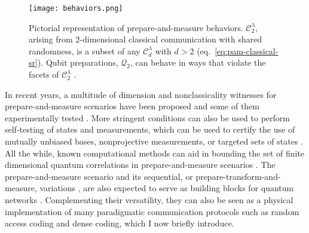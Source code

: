 			\begin{figure}
				\begin{minipage}[c]{0.43\textwidth}
					\centering
	                \texttt{[image: behaviors.png]}
			 	\end{minipage}
				\begin{minipage}[c]{0.55\textwidth}
					\caption{Pictorial representation of prepare-and-measure behaviors. $\mathcal{C}_2^\lambda$, arising from $2$-dimensional classical communication with shared randomness, is a subset of any $\mathcal{C}_d^\lambda$ with $d > 2$ (eq.~\ref{eq:pam-classical-sr}). Qubit preparations, $\mathcal{Q}_2$, can behave in ways that violate the facets of $\mathcal{C}_2^\lambda$ \cite{gallego_pam_2010}.}	
            		\label{fig:pam-behaviors}
			    \end{minipage}
			\end{figure}
			            
            \ornamentbreak
            
            In recent years, a multitude of dimension and nonclassicality witnesses for prepare-and-measure scenarios have been proposed \cite{gallego_pam_2010,brunner_dimension_2013,sikora_dimension_2016,dallarno_robustness_2012,de_vicente_bound_2019,bowles_certifying_2014,wehner_lower_2008} and some of them experimentally tested \cite{hendrych_experimental_2012,ahrens_experimental_2012,dambrosio_highdimensional_2014}. More stringent conditions can also be used to perform self-testing of states and measurements, which can be used to certify the use of mutually unbiased bases, nonprojective measurements, or targeted sets of states \cite{tavakoli_selftesting_2018,farkas_selftesting_2019,wei_selftesting_2019,mironowicz_fouroutcome_2019,tavakoli_selftesting_2020,miklin_universal_2021,moreno_pamdense_2021}. All the while, known computational methods can aid in bounding the set of finite dimensional quantum correlations in prepare-and-measure scenarios \cite{navascues_bounding_2015,navascues_characterizing_2015}. The prepare-and-measure scenario and its sequential, or prepare-transform-and-measure, variations \cite{mohan_sequential_2019,miklin_sequentialunsharp_2020}, are also expected to serve as building blocks for quantum networks \cite{bowles_pamnetworks_2015,wang_pamnetworks_2019}. Complementing their versatility, they can also be seen as a physical implementation of many paradigmatic communication protocols such as random access coding and dense coding, which I now briefly introduce.


